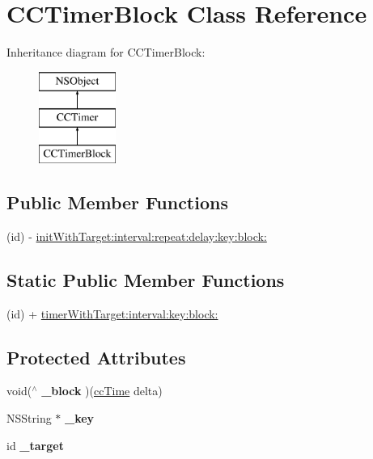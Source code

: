 \hypertarget{interface_c_c_timer_block}{\section{C\-C\-Timer\-Block Class Reference}
\label{interface_c_c_timer_block}
}
Inheritance diagram for C\-C\-Timer\-Block\-:\begin{figure}[H]
\begin{center}
\leavevmode
\includegraphics[height=3.000000cm]{interface_c_c_timer_block}
\end{center}
\end{figure}
\subsection*{Public Member Functions}
\begin{DoxyCompactItemize}
\item 
(id) -\/ \hyperlink{interface_c_c_timer_block_af676007948f158e93fcf744eb2225d9b}{init\-With\-Target\-:interval\-:repeat\-:delay\-:key\-:block\-:}
\end{DoxyCompactItemize}
\subsection*{Static Public Member Functions}
\begin{DoxyCompactItemize}
\item 
(id) + \hyperlink{interface_c_c_timer_block_a045150fbdd966b2a963b8afa4de20f4a}{timer\-With\-Target\-:interval\-:key\-:block\-:}
\end{DoxyCompactItemize}
\subsection*{Protected Attributes}
\begin{DoxyCompactItemize}
\item 
\hypertarget{interface_c_c_timer_block_a70da43d8a527343176ef625dcfac8234}{void($^\wedge$ {\bfseries \-\_\-block} )(\hyperlink{cc_types_8h_ae6c674aac4bfb46a4e6cb1e89bb66b4f}{cc\-Time} delta)}\label{interface_c_c_timer_block_a70da43d8a527343176ef625dcfac8234}

\item 
\hypertarget{interface_c_c_timer_block_aa15f13b176ce34d5413983bef29c7156}{N\-S\-String $\ast$ {\bfseries \-\_\-key}}\label{interface_c_c_timer_block_aa15f13b176ce34d5413983bef29c7156}

\item 
\hypertarget{interface_c_c_timer_block_a78f4ac4827481014fe793092014e27e7}{id {\bfseries \-\_\-target}}\label{interface_c_c_timer_block_a78f4ac4827481014fe793092014e27e7}

\end{DoxyCompactItemize}
